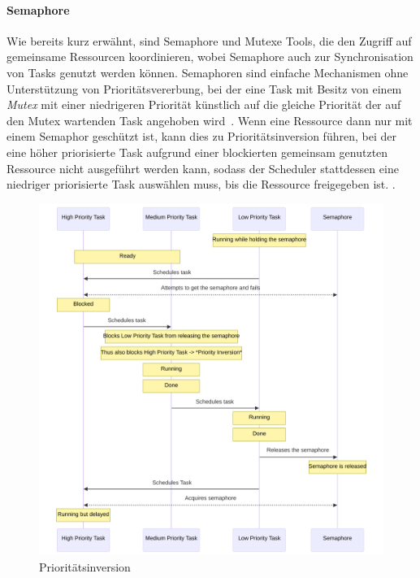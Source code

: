 \paragraph{Semaphore}

Wie bereits kurz erwähnt, sind Semaphore und Mutexe Tools, die den Zugriff auf
gemeinsame Ressourcen koordinieren, wobei Semaphore auch zur Synchronisation von
Tasks genutzt werden können. Semaphoren sind einfache Mechanismen ohne
Unterstützung von Prioritätsvererbung, bei der eine Task mit Besitz von einem
\textit{Mutex} mit einer niedrigeren Priorität künstlich auf die gleiche
Priorität der auf den Mutex wartenden Task angehoben
wird~\cite{wikipedia_priority_inheritance}. Wenn eine Ressource dann nur mit
einem Semaphor geschützt ist, kann dies zu Prioritätsinversion führen, bei der
eine höher priorisierte Task aufgrund einer blockierten gemeinsam genutzten
Ressource nicht ausgeführt werden kann, sodass der Scheduler stattdessen eine
niedriger priorisierte Task auswählen muss, bis die Ressource freigegeben ist.
\cite{wikipedia_priority_inversion}.

\begin{figure}[htb]
    \centering
    \includegraphics[width=1\textwidth]{assets/prio_inversion}
    \caption{Prioritätsinversion}
\end{figure}

